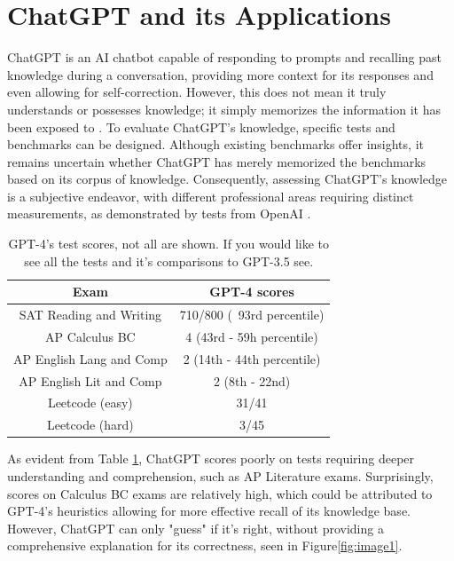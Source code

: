 \documentclass[letterpaper, 10pt, conference]{ieeeconf}
\begin{document}
   \section{ChatGPT and its Applications}
        ChatGPT is an AI chatbot capable of responding to prompts and recalling past knowledge during a conversation, providing more context for its responses and even allowing for self-correction. However, this does not mean it truly understands or possesses knowledge; it simply memorizes the information it has been exposed to \cite{bubeck2023sparks}. To evaluate ChatGPT's knowledge, specific tests and benchmarks can be designed. Although existing benchmarks offer insights, it remains uncertain whether ChatGPT has merely memorized the benchmarks based on its corpus of knowledge. Consequently, assessing ChatGPT's knowledge is a subjective endeavor, with different professional areas requiring distinct measurements, as demonstrated by tests from OpenAI \cite{openai2023gpt4}.

        \begin{table}
            \centering
            \caption{GPT-4's test scores, not all are shown. If you would like to see all the tests and it's comparisons to GPT-3.5 see\cite{openai2023gpt4}.}
            \label{tab:table1}
            \begin{tabular}{c|c}
                Exam & GPT-4 scores\\
                \hline
                SAT Reading and Writing & 710/800 (~93rd percentile)\\
                AP Calculus BC & 4 (43rd - 59h percentile)\\
                AP English Lang and Comp & 2 (14th - 44th percentile)\\
                AP English Lit and Comp & 2 (8th - 22nd)\\
                Leetcode (easy) & 31/41 \\
                Leetcode (hard) & 3/45 \\
                \hline
        
            \end{tabular}

        \end{table}

        As evident from Table \ref{tab:table1}, ChatGPT scores poorly on tests requiring deeper understanding and comprehension, such as AP Literature exams. Surprisingly, scores on Calculus BC exams are relatively high, which could be attributed to GPT-4's heuristics allowing for more effective recall of its knowledge base\cite{bubeck2023sparks}. However, ChatGPT can only "guess" if it's right, without providing a comprehensive explanation for its correctness, seen in Figure\ref{fig:image1}. 
\end{document}
